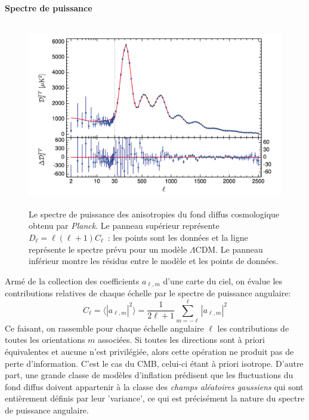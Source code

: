 \paragraph{Spectre de puissance}
\begin{figure}[htbp]
	\centering
		\includegraphics[height=8cm]{figs/cl2015.png}
		\caption[Le spectre de puissance des anisotropies du fond diffus cosmologique obtenu par \textit{Planck}.]{Le spectre de puissance des anisotropies du fond diffus cosmologique obtenu par \textit{Planck}. Le panneau supérieur représente $D_\ell=\ell(\ell+1)C_\ell$~: les points sont les données et la ligne représente le spectre prévu pour un modèle $\Lambda$CDM. Le panneau inférieur montre les résidus entre le modèle et les points de données.}
	\label{f:cl}
\end{figure}

Armé de la collection des coefficients $a_{\ell,m}$ d'une carte du ciel, on évalue les contributions relatives de chaque échelle par le spectre de puissance angulaire:
\begin{equation}
C_\ell=\langle |a_{\ell,m}|^2\rangle=\frac{1}{2\ell+1}\sum_{m=-\ell}^{\ell} |a_{\ell,m}|^2
\end{equation}
Ce faisant, on rassemble pour chaque échelle angulaire $\ell$ les contributions de toutes les orientations $m$ associées. Si toutes les directions sont à priori équivalentes et aucune n'est privilégiée, alors cette opération ne produit pas de perte d'information. C'est le cas du CMB, celui-ci étant à priori isotrope. D'autre part, une grande classe de modèles d'inflation prédisent que les fluctuations du fond diffus doivent appartenir à la classe des \textit{champs aléatoires gaussiens} qui sont entièrement définis par leur 'variance', ce qui est précisément la nature du spectre de puissance angulaire.

